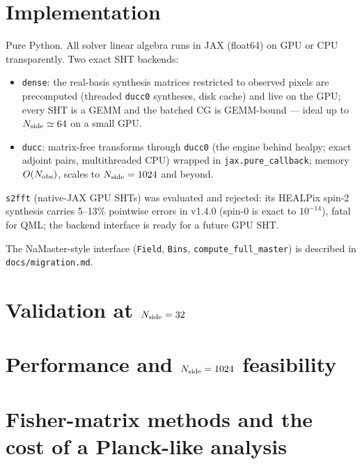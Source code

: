 \documentclass[11pt,a4paper]{article}
\begin{document}
\section{Implementation}
\label{sec:impl}
Pure Python.  All solver linear algebra runs in JAX (float64) on GPU or
CPU transparently.  Two exact SHT backends:
\begin{itemize}
\item \texttt{dense}: the real-basis synthesis matrices restricted to
  observed pixels are precomputed (threaded \texttt{ducc0} syntheses, disk
  cache) and live on the GPU; every SHT is a GEMM and the batched CG is
  GEMM-bound --- ideal up to $N_{\rm side}\simeq64$ on a small GPU.
\item \texttt{ducc}: matrix-free transforms through \texttt{ducc0} (the
  engine behind healpy; exact adjoint pairs, multithreaded CPU) wrapped in
  \texttt{jax.pure\_callback}; memory $O(N_{\rm obs})$, scales to
  $N_{\rm side}=1024$ and beyond.
\end{itemize}
\texttt{s2fft} (native-JAX GPU SHTs) was evaluated and rejected: its
HEALPix spin-2 synthesis carries 5--13\% pointwise errors in v1.4.0
(spin-0 is exact to $10^{-14}$), fatal for QML; the backend interface is
ready for a future GPU SHT.

The NaMaster-style interface (\texttt{Field}, \texttt{Bins},
\texttt{compute\_full\_master}) is described in \texttt{docs/migration.md}.

\section{Validation at $N_{\rm side}=32$}
\label{sec:validation}


\section{Performance and $N_{\rm side}=1024$ feasibility}
\label{sec:feasibility}


\section{Fisher-matrix methods and the cost of a Planck-like analysis}
\label{sec:fishercost}

\end{document}
